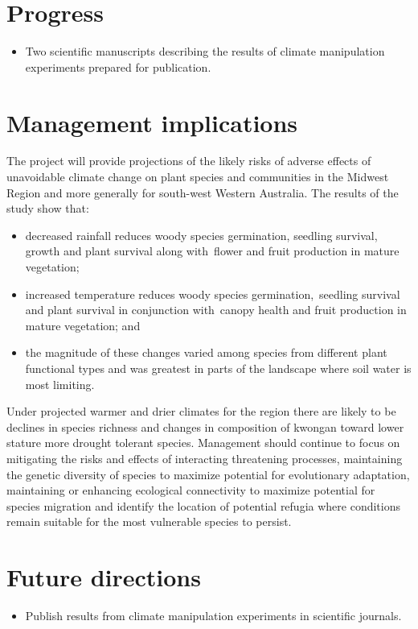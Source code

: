 \documentclass[version=last,
    paper=a4, %
    10pt, %
    usenames,
    dvipsnames,
    oneside, %
    headings=openany, %
    DIV=15 %
]{scrbook}
\begin{document}
\section*{Progress}
\begin{itemize}
\itemsep1pt\parskip0pt
\item
  Two scientific manuscripts describing the results of climate
  manipulation experiments prepared for publication.
\end{itemize}



\section*{Management implications}
The project will provide projections of the likely risks of adverse
effects of unavoidable climate change on plant species and communities
in the Midwest Region and more generally for south-west Western
Australia. The results of the study show that:

\begin{itemize}
\itemsep1pt\parskip0pt
\item
  decreased rainfall reduces woody species germination, seedling
  survival, growth and plant survival along with~flower and fruit
  production in mature vegetation;
\item
  increased temperature reduces woody species germination,~seedling
  survival and plant survival in conjunction with~canopy health and
  fruit production in mature vegetation; and
\item
  the magnitude of these changes varied among species from different
  plant functional types and was greatest in parts of the landscape
  where soil water is most limiting.
\end{itemize}

Under projected warmer and drier climates for the region there are
likely to be declines in species richness and changes in composition of
kwongan toward lower stature more drought tolerant species. Management
should continue to focus on mitigating the risks and effects of
interacting threatening processes, maintaining the genetic diversity of
species to maximize potential for evolutionary adaptation, maintaining
or enhancing ecological connectivity to maximize potential for species
migration and identify the location of potential refugia where
conditions remain suitable for the most vulnerable species to persist.



\section*{Future directions}
\begin{itemize}
\itemsep1pt\parskip0pt
\item
  Publish results from climate manipulation experiments in scientific
  journals.
\end{itemize}



\end{document}

